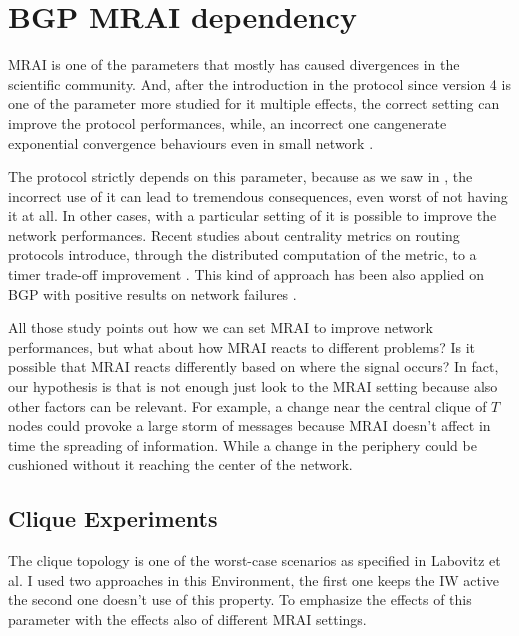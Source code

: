 \chapter{BGP MRAI dependency}
\label{cha:bgp_mrai_experiments}

\ac{MRAI} is one of the parameters that mostly has caused divergences in the 
scientific community.
And, after the introduction in the protocol since version 4 \cite{rfc4271}
is one of the parameter more studied for it multiple effects, the correct setting
can improve the protocol performances, while, an incorrect one cangenerate 
exponential convergence behaviours even in small network 
\cite{fabrikant2011there,griffin2001experimental}.

The protocol strictly depends on this parameter, because as we saw in ,
the incorrect use of it can lead to tremendous consequences, even worst of not
having it at all.
In other cases, with a particular setting of it is possible to improve the network
performances.
Recent studies about centrality metrics on routing protocols introduce, through 
the distributed computation of the metric, to a 
timer trade-off improvement \cite{MaLo18_ToN,GhiMa18_infocom}.
This kind of approach has been also applied on \ac{BGP} with positive results on
network failures \cite{milani2019BGP,milani2020improving}.

All those study points out how we can set \ac{MRAI} to improve network
performances, but what about how \ac{MRAI} reacts to different problems?
Is it possible that \ac{MRAI} reacts differently based on where the signal
occurs?
In fact, our hypothesis is that is not enough just look to the \ac{MRAI} setting
because also other factors can be relevant.
For example, a change near the central clique of $T$ nodes could provoke a large
storm of messages because \ac{MRAI} doesn't affect in time the spreading of information.
While a change in the periphery could be cushioned without it reaching the center
of the network.

\section{Clique Experiments}
\label{sec:bgp_mrai_clique}

The clique topology is one of the worst-case scenarios as specified in Labovitz et al.
\cite{labovitz2000delayed}
I used two approaches in this Environment, the first one keeps the \ac{IW} active
the second one doesn't use of this property.
To emphasize the effects of this parameter with the effects also of different 
\ac{MRAI} settings.

